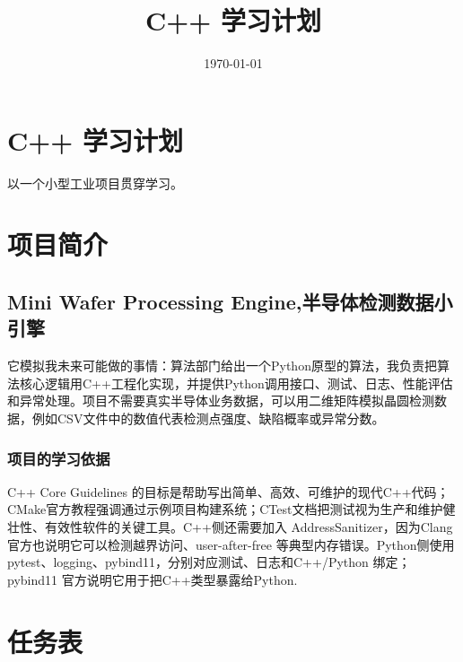 \documentclass[UTF8,a4paper,12pt]{ctexart}
\date{\today}
\title{C++ 学习计划}
\begin{document}
\maketitle
\tableofcontents

\section{C++ 学习计划}
\label{sec:org22a228c}
以一个小型工业项目贯穿学习。
\section{项目简介}
\label{sec:org7b38a4d}
\subsection{Mini Wafer Processing Engine,半导体检测数据小引擎}
\label{sec:org01c0cc7}

它模拟我未来可能做的事情：算法部门给出一个Python原型的算法，我负责把算法核心逻辑用C++工程化实现，并提供Python调用接口、测试、日志、性能评估和异常处理。项目不需要真实半导体业务数据，可以用二维矩阵模拟晶圆检测数据，例如CSV文件中的数值代表检测点强度、缺陷概率或异常分数。
\subsubsection{项目的学习依据}
\label{sec:orgd5ec7b2}

C++ Core Guidelines 的目标是帮助写出简单、高效、可维护的现代C++代码；CMake官方教程强调通过示例项目构建系统；CTest文档把测试视为生产和维护健壮性、有效性软件的关键工具。C++侧还需要加入 AddressSanitizer，因为Clang官方也说明它可以检测越界访问、user-after-free 等典型内存错误。Python侧使用pytest、logging、pybind11，分别对应测试、日志和C++/Python 绑定；pybind11 官方说明它用于把C++类型暴露给Python.
\section{任务表}
\label{sec:org53473d5}
\end{document}
